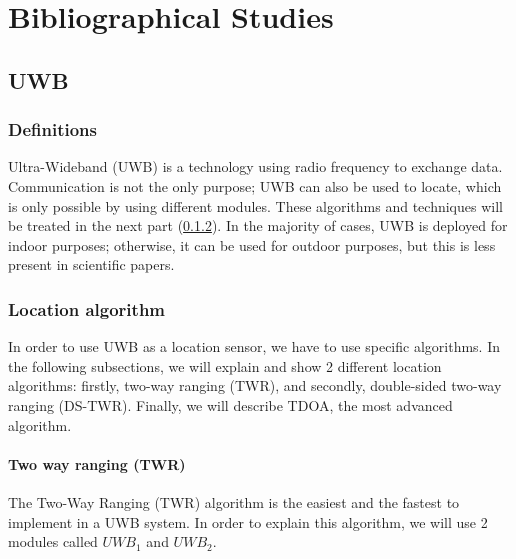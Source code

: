 \chapter*{Bibliographical Studies}

\section{UWB}

\subsection{Definitions} 
Ultra-Wideband (UWB) is a technology using radio frequency to exchange data.
Communication is not the only purpose; UWB can also be used to locate, which is only possible by using different modules. These algorithms and techniques will be treated in the next part (\ref{UWB_Algo_localisation}).
In the majority of cases, UWB is deployed for indoor purposes; otherwise, it can be used for outdoor purposes, but this is less present in scientific papers.


\subsection{Location algorithm}\label{UWB_Algo_localisation}
In order to use UWB as a location sensor, we have to use specific algorithms. In the following subsections, we will explain and show 2 different location algorithms: firstly, two-way ranging (TWR), and secondly, double-sided two-way ranging (DS-TWR). Finally, we will describe TDOA, the most advanced algorithm.

\subsubsection{Two way ranging (TWR)}
The Two-Way Ranging (TWR) algorithm is the easiest and the fastest to implement in a UWB system.
In order to explain this algorithm, we will use 2 modules called $UWB_1$ and $UWB_2$.

